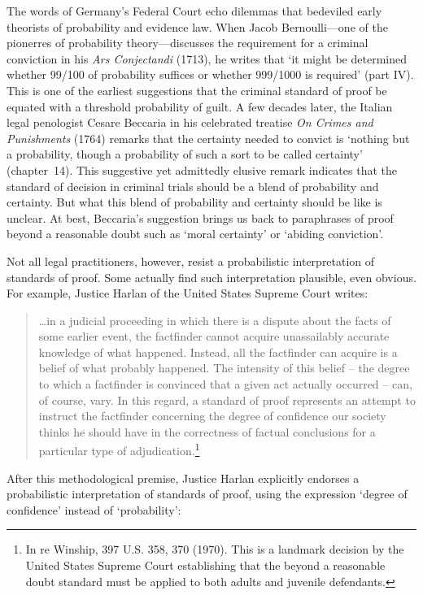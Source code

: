 \documentclass[10pt,dvipsnames,enabledeprecatedfontcommands]{scrartcl}
\begin{document}
The words of Germany's Federal Court echo dilemmas that bedeviled early
theorists of probability and evidence law. When Jacob Bernoulli---one of
the pionerres of probability theory---discusses the requirement for a
criminal conviction in his \textit{Ars Conjectandi} (1713), he writes
that `it might be determined whether 99/100 of probability suffices or
whether 999/1000 is required' (part IV). This is one of the earliest
suggestions that the criminal standard of proof be equated with a
threshold probability of guilt. A few decades later, the Italian legal
penologist Cesare Beccaria in his celebrated treatise
\textit{On Crimes and Punishments} (1764) remarks that the certainty
needed to convict is `nothing but a probability, though a probability of
such a sort to be called certainty' (chapter~14). This suggestive yet
admittedly elusive remark indicates that the standard of decision in
criminal trials should be a blend of probability and certainty. But what
this blend of probability and certainty should be like is unclear. At
best, Beccaria's suggestion brings us back to paraphrases of proof
beyond a reasonable doubt such as `moral certainty' or `abiding
conviction'.

Not all legal practitioners, however, resist a probabilistic
interpretation of standards of proof. Some actually find such
interpretation plausible, even obvious. For example, Justice Harlan of
the United States Supreme Court writes:

\begin{quote}
\dots in a judicial proceeding in which there is a dispute about the facts of some earlier event, the factfinder cannot acquire unassailably accurate knowledge of what happened. Instead, all the factfinder can acquire is a belief of what probably happened. The intensity of this belief -- the degree to which a factfinder is convinced that a given act actually occurred -- can, of course, vary. In this regard, a standard of proof represents an attempt to instruct the factfinder concerning the degree of confidence our society thinks he should have in the correctness of factual conclusions for a particular type of adjudication.\footnote{In re Winship, 397 U.S. 358, 370 (1970). This is a landmark decision by the United States Supreme Court establishing  that the beyond a reasonable doubt standard must be applied to both adults and juvenile defendants.}
\end{quote}

\noindent
After this methodological premise, Justice Harlan explicitly endorses a
probabilistic interpretation of standards of proof, using the expression
`degree of confidence' instead of `probability':
\end{document}
